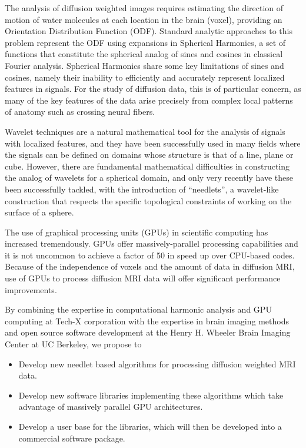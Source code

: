 \documentclass[10pt]{article}
\begin{document}
The analysis of diffusion weighted images requires estimating the direction of
motion of water molecules at each location in the brain (voxel), providing an
Orientation Distribution Function (ODF).  Standard analytic approaches to this
problem represent the ODF using expansions in Spherical Harmonics, a set of
functions that constitute the spherical analog of sines and cosines in
classical Fourier analysis.  Spherical Harmonics share some key limitations of
sines and cosines, namely their inability to efficiently and accurately
represent localized features in signals.  For the study of diffusion data, this
is of particular concern, as many of the key features of the data arise
precisely from complex local patterns of anatomy such as crossing neural
fibers.

Wavelet techniques are a natural mathematical tool for the analysis of signals
with localized features, and they have been successfully used in many fields
where the signals can be defined on domains whose structure is that of a line,
plane or cube.  However, there are fundamental mathematical difficulties in
constructing the analog of wavelets for a spherical domain, and only very
recently have these been successfully tackled, with the introduction of
``needlets'', a wavelet-like construction that respects the specific
topological constraints of working on the surface of a sphere.

The use of graphical processing units (GPUs) in scientific computing has
increased tremendously. GPUs offer massively-parallel processing capabilities
and it is not uncommon to achieve a factor of 50 in speed up over CPU-based
codes. Because of the independence of voxels and the amount of data in
diffusion MRI, use of GPUs to process diffusion MRI data will offer significant
performance improvements.

By combining the expertise in computational harmonic analysis and GPU computing
at Tech-X corporation with the expertise in brain imaging methods and open
source software development at the Henry H. Wheeler Brain Imaging Center at UC
Berkeley, we propose to

\begin{itemize}
\item{Develop new needlet based algorithms for processing diffusion weighted
    MRI data.}
\item{Develop new software libraries implementing these algorithms which take
    advantage of massively parallel GPU architectures.}
\item{Develop a user base for the libraries, which will then be developed into
    a commercial software package.}
\end{itemize}
\end{document}
